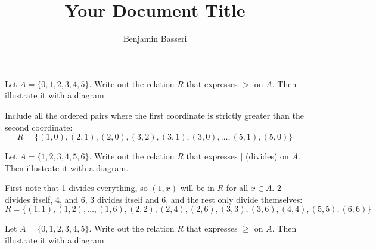 \documentclass{article}
\title{Your Document Title}
\author{Benjamin Basseri}
\begin{document}
\maketitle

\begin{problem}
Let $A = \{0, 1, 2, 3, 4, 5\}$. Write out the relation $R$ that expresses $ > $ on $A$. Then illustrate it with a diagram.
\end{problem}

Include all the ordered pairs where the first coordinate is strictly greater than the second coordinate:
$$R = \{(1, 0), (2, 1), (2, 0), (3, 2), (3, 1), (3, 0), \ldots , (5, 1), (5, 0)\}$$

\begin{problem}
Let $A = \{1, 2, 3, 4, 5, 6\}$. Write out the relation $R$ that expresses $\mid$ (divides) on $A$. Then illustrate it with a diagram.
\end{problem}

First note that 1 divides everything, so $(1, x)$ will be in $R$ for all $x \in A$. 2 divides itself, 4, and 6, 3 divides itself and 6, and the rest only divide themselves:
$$R = \{(1, 1), (1, 2), \ldots, (1, 6), (2, 2), (2, 4), (2, 6), (3, 3), (3, 6), (4, 4), (5, 5), (6, 6)\}$$

\begin{problem}
Let $A = \{0, 1, 2, 3, 4, 5\}$. Write out the relation $R$ that expresses $\geq$ on $A$. Then illustrate it with a diagram.
\end{problem}
\end{document}
